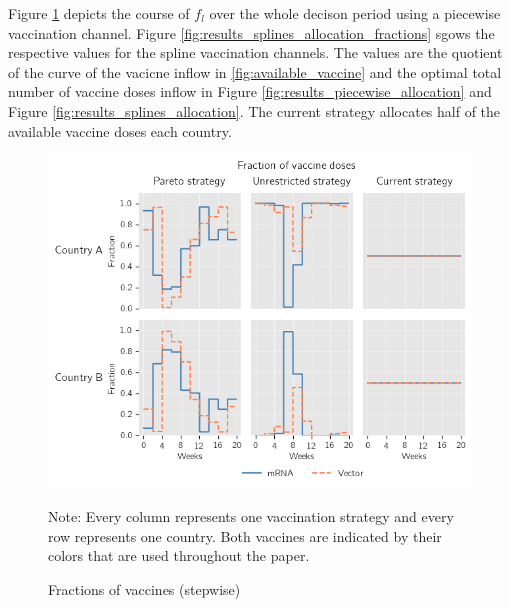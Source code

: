 Figure \ref{fig:results_piecewise_allocation_fractions} depicts the course of $f_l$ over the whole decison period using a piecewise vaccination channel. Figure \ref{fig:results_splines_allocation_fractions} sgows the respective values for the spline vaccination channels. The values are the quotient of the curve of the vacicne inflow in \ref{fig:available_vaccine} and the optimal total number of vaccine doses inflow in Figure \ref{fig:results_piecewise_allocation} and Figure \ref{fig:results_splines_allocation}. The current strategy allocates half of the available vaccine doses each country.
\begin{figure}[h!]
\centering
\includegraphics[scale=0.75]{images/piecewise_vaccine_fractions.png}\\
\begin{flushleft}
\scriptsize{Note:} Every column represents one vaccination strategy and every row represents one country. Both vaccines are indicated by their colors that are used throughout the paper. 
\end{flushleft}
\caption{Fractions of vaccines (stepwise)}
\label{fig:results_piecewise_allocation_fractions}
\end{figure}

